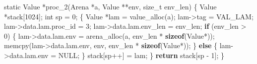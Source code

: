 \documentclass[]{article}
\newenvironment{Shaded}{}{}
\newcommand{\ControlFlowTok}[1]{\textcolor[rgb]{0.00,0.44,0.13}{\textbf{#1}}}
\newcommand{\DataTypeTok}[1]{\textcolor[rgb]{0.56,0.13,0.00}{#1}}
\newcommand{\DecValTok}[1]{\textcolor[rgb]{0.25,0.63,0.44}{#1}}
\newcommand{\KeywordTok}[1]{\textcolor[rgb]{0.00,0.44,0.13}{\textbf{#1}}}
\newcommand{\NormalTok}[1]{#1}
\newcommand{\OperatorTok}[1]{\textcolor[rgb]{0.40,0.40,0.40}{#1}}
\begin{document}
\begin{Shaded}
\begin{Highlighting}[]
\DataTypeTok{static}\NormalTok{ Value }\OperatorTok{*}\NormalTok{proc\_2}\OperatorTok{(}\NormalTok{Arena }\OperatorTok{*}\NormalTok{a}\OperatorTok{,}\NormalTok{ Value }\OperatorTok{**}\NormalTok{env}\OperatorTok{,} \DataTypeTok{size\_t}\NormalTok{ env\_len}\OperatorTok{)} \OperatorTok{\{}
\NormalTok{    Value }\OperatorTok{*}\NormalTok{stack}\OperatorTok{[}\DecValTok{1024}\OperatorTok{];}
    \DataTypeTok{int}\NormalTok{ sp }\OperatorTok{=} \DecValTok{0}\OperatorTok{;}
    \OperatorTok{\{}
\NormalTok{        Value }\OperatorTok{*}\NormalTok{lam }\OperatorTok{=}\NormalTok{ value\_alloc}\OperatorTok{(}\NormalTok{a}\OperatorTok{);}
\NormalTok{        lam}\OperatorTok{{-}\textgreater{}}\NormalTok{tag }\OperatorTok{=}\NormalTok{ VAL\_LAM}\OperatorTok{;}
\NormalTok{        lam}\OperatorTok{{-}\textgreater{}}\NormalTok{data}\OperatorTok{.}\NormalTok{lam}\OperatorTok{.}\NormalTok{proc\_id }\OperatorTok{=} \DecValTok{3}\OperatorTok{;}
\NormalTok{        lam}\OperatorTok{{-}\textgreater{}}\NormalTok{data}\OperatorTok{.}\NormalTok{lam}\OperatorTok{.}\NormalTok{env\_len }\OperatorTok{=}\NormalTok{ env\_len}\OperatorTok{;}
        \ControlFlowTok{if} \OperatorTok{(}\NormalTok{env\_len }\OperatorTok{\textgreater{}} \DecValTok{0}\OperatorTok{)} \OperatorTok{\{}
\NormalTok{            lam}\OperatorTok{{-}\textgreater{}}\NormalTok{data}\OperatorTok{.}\NormalTok{lam}\OperatorTok{.}\NormalTok{env }\OperatorTok{=}\NormalTok{ arena\_alloc}\OperatorTok{(}\NormalTok{a}\OperatorTok{,}\NormalTok{ env\_len }\OperatorTok{*} \KeywordTok{sizeof}\OperatorTok{(}\NormalTok{Value}\OperatorTok{*));}
\NormalTok{            memcpy}\OperatorTok{(}\NormalTok{lam}\OperatorTok{{-}\textgreater{}}\NormalTok{data}\OperatorTok{.}\NormalTok{lam}\OperatorTok{.}\NormalTok{env}\OperatorTok{,}\NormalTok{ env}\OperatorTok{,}\NormalTok{ env\_len }\OperatorTok{*} \KeywordTok{sizeof}\OperatorTok{(}\NormalTok{Value}\OperatorTok{*));}
        \OperatorTok{\}} \ControlFlowTok{else} \OperatorTok{\{}
\NormalTok{            lam}\OperatorTok{{-}\textgreater{}}\NormalTok{data}\OperatorTok{.}\NormalTok{lam}\OperatorTok{.}\NormalTok{env }\OperatorTok{=}\NormalTok{ NULL}\OperatorTok{;}
        \OperatorTok{\}}
\NormalTok{        stack}\OperatorTok{[}\NormalTok{sp}\OperatorTok{++]} \OperatorTok{=}\NormalTok{ lam}\OperatorTok{;}
    \OperatorTok{\}}
    \ControlFlowTok{return}\NormalTok{ stack}\OperatorTok{[}\NormalTok{sp }\OperatorTok{{-}} \DecValTok{1}\OperatorTok{];}
\OperatorTok{\}}


\end{Highlighting}
\end{Shaded}
\end{document}
